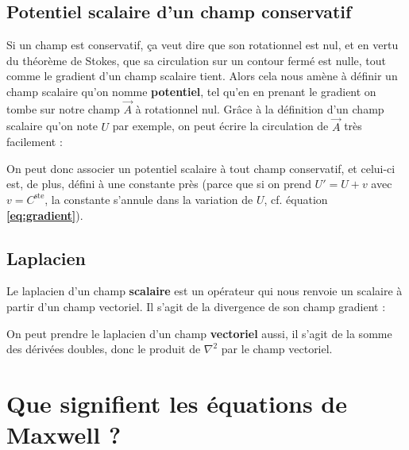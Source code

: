 \documentclass[12pt]{book}
\begin{document}
 \subsection{Potentiel scalaire d'un champ conservatif}
 Si un champ est conservatif, ça veut dire que son rotationnel est nul, et en vertu du théorème de Stokes, que sa circulation sur un contour fermé est nulle, tout comme le gradient d'un champ scalaire tient. Alors cela nous amène à définir un champ scalaire qu'on nomme \textbf{potentiel}, tel qu'en en prenant le gradient on tombe sur notre champ $\vec{A}$ à rotationnel nul. Grâce à la définition d'un champ scalaire qu'on note $U$ par exemple, on peut écrire la circulation de $\vec{A}$ très facilement :
 
 On peut donc associer un potentiel scalaire à tout champ conservatif, et celui-ci est, de plus, défini à une constante près (parce que si on prend $U' = U + v$ avec $v = C^{\text{ste}}$, la constante s'annule dans la variation de $U$, cf. équation \textbf{\ref{eq:gradient}}).
 
 \subsection{Laplacien}
 Le laplacien d'un champ \textbf{scalaire} est un opérateur qui nous renvoie un scalaire à partir d'un champ vectoriel. Il s'agit de la divergence de son champ gradient :
 
 On peut prendre le laplacien d'un champ \textbf{vectoriel} aussi, il s'agit de la somme des dérivées doubles, donc le produit de $\nabla^2$ par le champ vectoriel.
 
 
 \section{Que signifient les équations de Maxwell ?}
  
\end{document}
